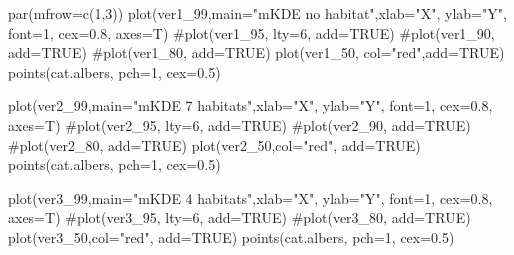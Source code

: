 \documentclass[
  letterpaper,
]{book}
\newenvironment{Shaded}{\begin{snugshade}}{\end{snugshade}}
\newcommand{\AttributeTok}[1]{\textcolor[rgb]{0.40,0.45,0.13}{#1}}
\newcommand{\CommentTok}[1]{\textcolor[rgb]{0.37,0.37,0.37}{#1}}
\newcommand{\ConstantTok}[1]{\textcolor[rgb]{0.56,0.35,0.01}{#1}}
\newcommand{\DecValTok}[1]{\textcolor[rgb]{0.68,0.00,0.00}{#1}}
\newcommand{\FloatTok}[1]{\textcolor[rgb]{0.68,0.00,0.00}{#1}}
\newcommand{\FunctionTok}[1]{\textcolor[rgb]{0.28,0.35,0.67}{#1}}
\newcommand{\NormalTok}[1]{\textcolor[rgb]{0.00,0.23,0.31}{#1}}
\newcommand{\StringTok}[1]{\textcolor[rgb]{0.13,0.47,0.30}{#1}}
\begin{document}
\begin{Shaded}
\begin{Highlighting}[]
\FunctionTok{par}\NormalTok{(}\AttributeTok{mfrow=}\FunctionTok{c}\NormalTok{(}\DecValTok{1}\NormalTok{,}\DecValTok{3}\NormalTok{))}
\FunctionTok{plot}\NormalTok{(ver1\_99,}\AttributeTok{main=}\StringTok{"mKDE no habitat"}\NormalTok{,}\AttributeTok{xlab=}\StringTok{"X"}\NormalTok{, }\AttributeTok{ylab=}\StringTok{"Y"}\NormalTok{, }\AttributeTok{font=}\DecValTok{1}\NormalTok{, }\AttributeTok{cex=}\FloatTok{0.8}\NormalTok{, }\AttributeTok{axes=}\NormalTok{T)}
\CommentTok{\#plot(ver1\_95, lty=6, add=TRUE)}
\CommentTok{\#plot(ver1\_90, add=TRUE)}
\CommentTok{\#plot(ver1\_80, add=TRUE)}
\FunctionTok{plot}\NormalTok{(ver1\_50, }\AttributeTok{col=}\StringTok{"red"}\NormalTok{,}\AttributeTok{add=}\ConstantTok{TRUE}\NormalTok{)}
\FunctionTok{points}\NormalTok{(cat.albers, }\AttributeTok{pch=}\DecValTok{1}\NormalTok{, }\AttributeTok{cex=}\FloatTok{0.5}\NormalTok{)}

\FunctionTok{plot}\NormalTok{(ver2\_99,}\AttributeTok{main=}\StringTok{"mKDE 7 habitats"}\NormalTok{,}\AttributeTok{xlab=}\StringTok{"X"}\NormalTok{, }\AttributeTok{ylab=}\StringTok{"Y"}\NormalTok{, }\AttributeTok{font=}\DecValTok{1}\NormalTok{, }\AttributeTok{cex=}\FloatTok{0.8}\NormalTok{, }\AttributeTok{axes=}\NormalTok{T)}
\CommentTok{\#plot(ver2\_95, lty=6, add=TRUE)}
\CommentTok{\#plot(ver2\_90, add=TRUE)}
\CommentTok{\#plot(ver2\_80, add=TRUE)}
\FunctionTok{plot}\NormalTok{(ver2\_50,}\AttributeTok{col=}\StringTok{"red"}\NormalTok{, }\AttributeTok{add=}\ConstantTok{TRUE}\NormalTok{)}
\FunctionTok{points}\NormalTok{(cat.albers, }\AttributeTok{pch=}\DecValTok{1}\NormalTok{, }\AttributeTok{cex=}\FloatTok{0.5}\NormalTok{)}

\FunctionTok{plot}\NormalTok{(ver3\_99,}\AttributeTok{main=}\StringTok{"mKDE 4 habitats"}\NormalTok{,}\AttributeTok{xlab=}\StringTok{"X"}\NormalTok{, }\AttributeTok{ylab=}\StringTok{"Y"}\NormalTok{, }\AttributeTok{font=}\DecValTok{1}\NormalTok{, }\AttributeTok{cex=}\FloatTok{0.8}\NormalTok{, }\AttributeTok{axes=}\NormalTok{T)}
\CommentTok{\#plot(ver3\_95, lty=6, add=TRUE)}
\CommentTok{\#plot(ver3\_80, add=TRUE)}
\FunctionTok{plot}\NormalTok{(ver3\_50,}\AttributeTok{col=}\StringTok{"red"}\NormalTok{, }\AttributeTok{add=}\ConstantTok{TRUE}\NormalTok{)}
\FunctionTok{points}\NormalTok{(cat.albers, }\AttributeTok{pch=}\DecValTok{1}\NormalTok{, }\AttributeTok{cex=}\FloatTok{0.5}\NormalTok{)}
\end{Highlighting}
\end{Shaded}
\end{document}
